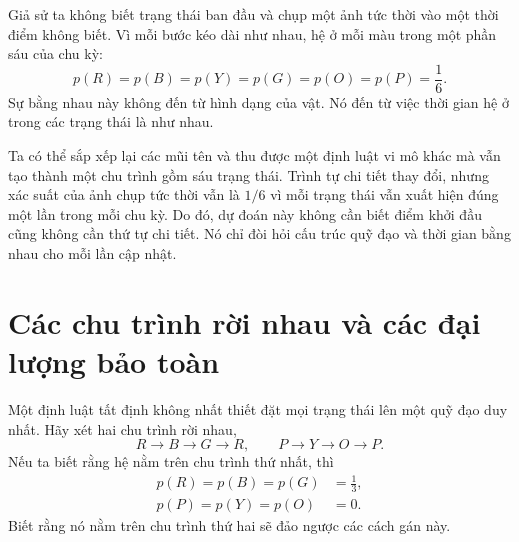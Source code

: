 Giả sử ta không biết trạng thái ban đầu và chụp một ảnh tức thời vào một thời điểm không biết. Vì mỗi bước kéo dài như nhau, hệ ở mỗi màu trong một phần sáu của chu kỳ:
\begin{equation}
 p(R)=p(B)=p(Y)=p(G)=p(O)=p(P)=\frac16.
 \label{eq:sm1-uniform-cycle}
\end{equation}
Sự bằng nhau này không đến từ hình dạng của vật. Nó đến từ việc thời gian hệ ở trong các trạng thái là như nhau.

Ta có thể sắp xếp lại các mũi tên và thu được một định luật vi mô khác mà vẫn tạo thành một chu trình gồm sáu trạng thái. Trình tự chi tiết thay đổi, nhưng xác suất của ảnh chụp tức thời vẫn là \(1/6\) vì mỗi trạng thái vẫn xuất hiện đúng một lần trong mỗi chu kỳ. Do đó, dự đoán này không cần biết điểm khởi đầu cũng không cần thứ tự chi tiết. Nó chỉ đòi hỏi cấu trúc quỹ đạo và thời gian bằng nhau cho mỗi lần cập nhật.

\begin{classroomqa}
\end{classroomqa}

\section{Các chu trình rời nhau và các đại lượng bảo toàn}

Một định luật tất định không nhất thiết đặt mọi trạng thái lên một quỹ đạo duy nhất. Hãy xét hai chu trình rời nhau,
\begin{equation}
 R\longrightarrow B\longrightarrow G\longrightarrow R,
 \qquad
 P\longrightarrow Y\longrightarrow O\longrightarrow P.
 \label{eq:sm1-two-cycles}
\end{equation}
Nếu ta biết rằng hệ nằm trên chu trình thứ nhất, thì
\begin{equation}
 \begin{aligned}
 p(R)=p(B)=p(G)&=\frac13,\\
 p(P)=p(Y)=p(O)&=0.
 \end{aligned}
\end{equation}
Biết rằng nó nằm trên chu trình thứ hai sẽ đảo ngược các cách gán này.


